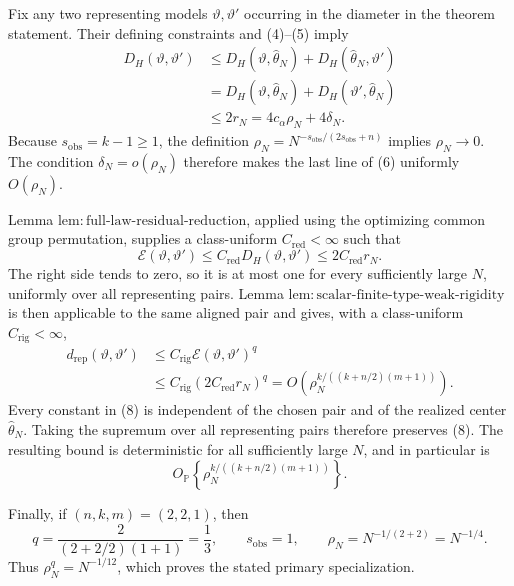 Fix any two representing models \(\vartheta,\vartheta'\) occurring in the diameter in the theorem statement.  Their defining constraints and (4)--(5) imply
\[
\begin{aligned}
 D_H(\vartheta,\vartheta')
 &\leq D_H(\vartheta,\widehat\theta_N)
       +D_H(\widehat\theta_N,\vartheta')\\
 &=D_H(\vartheta,\widehat\theta_N)
       +D_H(\vartheta',\widehat\theta_N)\\
 &\leq2r_N=4c_\alpha\rho_N+4\delta_N.
\end{aligned}
\tag{6}
\]
Because \(s_{\mathrm{obs}}=k-1\geq1\), the definition
\(
 \rho_N=N^{-s_{\mathrm{obs}}/(2s_{\mathrm{obs}}+n)}
\)
implies \(\rho_N\to0\).  The condition \(\delta_N=o(\rho_N)\) therefore makes the last line of (6) uniformly \(O(\rho_N)\).

Lemma \(\mathrm{lem:full\text{-}law\text{-}residual\text{-}reduction}\), applied using the optimizing common group permutation, supplies a class-uniform \(C_{\mathrm{red}}<\infty\) such that
\[
 \mathcal E(\vartheta,\vartheta')
 \leq C_{\mathrm{red}}D_H(\vartheta,\vartheta')
 \leq2C_{\mathrm{red}}r_N.
\tag{7}
\]
The right side tends to zero, so it is at most one for every sufficiently large \(N\), uniformly over all representing pairs.  Lemma \(\mathrm{lem:scalar\text{-}finite\text{-}type\text{-}weak\text{-}rigidity}\) is then applicable to the same aligned pair and gives, with a class-uniform \(C_{\mathrm{rig}}<\infty\),
\[
\begin{aligned}
 d_{\mathrm{rep}}(\vartheta,\vartheta')
 &\leq C_{\mathrm{rig}}\mathcal E(\vartheta,\vartheta')^q\\
 &\leq C_{\mathrm{rig}}(2C_{\mathrm{red}}r_N)^q
 =O\!\left(\rho_N^{k/((k+n/2)(m+1))}\right).
\end{aligned}
\tag{8}
\]
Every constant in (8) is independent of the chosen pair and of the realized center \(\widehat\theta_N\).  Taking the supremum over all representing pairs therefore preserves (8).  The resulting bound is deterministic for all sufficiently large \(N\), and in particular is
\[
 O_{\mathbb P}\!\left\{\rho_N^{k/((k+n/2)(m+1))}\right\}.
\]

Finally, if \((n,k,m)=(2,2,1)\), then
\[
 q=\frac{2}{(2+2/2)(1+1)}=\frac13,
 \qquad
 s_{\mathrm{obs}}=1,
 \qquad
 \rho_N=N^{-1/(2+2)}=N^{-1/4}.
\]
Thus \(\rho_N^q=N^{-1/12}\), which proves the stated primary specialization.
